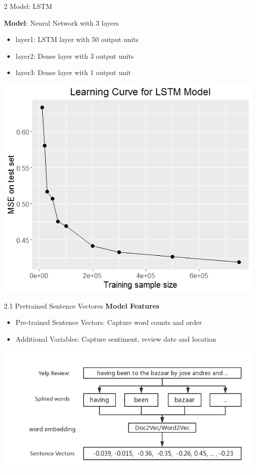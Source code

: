 \documentclass[10pt]{beamer}
\begin{document}
\begin{frame}{2 Model: LSTM}

\textbf{Model}: Neural Network with 3 layers\\
\begin{itemize}
	\item layer1: LSTM layer with 50 output units
	\item layer2: Dense layer with 3 output units
	\item layer3: Dense layer with 1 output unit
\end{itemize}

\centering
\includegraphics[scale=0.4]{../image/learning_curve.png}


\end{frame}




\begin{frame}{2.1 Pretrained Sentence Vectores}
\textbf{Model Features}
\begin{itemize}
	\item Pre-trained Sentence Vectors: Capture word counts and order
	\item Additional  Variables: Capture sentiment, review date and location
\end{itemize}
\centering
\includegraphics[scale=0.4]{../image/embedding.png}


\end{frame}
\end{document}
